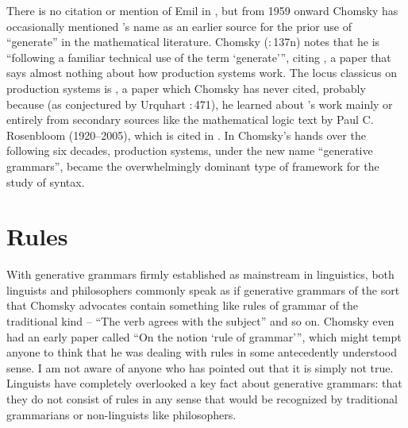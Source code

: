 \documentclass[output=paper]{langscibook}
\begin{document}
There is no citation or mention of Emil {\Post} in \citet{Chomsky55LSLT}, but from 1959 onward Chomsky has occasionally mentioned {\Post}'s name as an earlier source for the prior use of ``generate'' in the mathematical literature. Chomsky (\citeyear{Chomsky59CFPG}:\,137n) notes that he is ``following a familiar technical use of the term `generate'\thinspace'', citing \citet{Post44}, a paper that says almost nothing about how production systems work. The locus classicus on production systems is \citet{Post43}, a paper which Chomsky has never cited, probably because (as conjectured by Urquhart \citeyear{Urquhart09}:\,471), he learned about {\Post}'s work mainly or entirely from secondary sources like the \citeyear{Rosenbloom50} mathematical logic text by Paul C. Rosenbloom (1920--2005), which is cited in \citet{Chomsky75LSLT}. In Chomsky's hands over the following six decades, production systems, under the new name ``generative grammars'', became the overwhelmingly dominant type of framework for the study of syntax.

\section{Rules}
\label{sec:pullum:rules}

With generative grammars firmly established as mainstream in linguistics, both linguists and philosophers commonly speak as if generative grammars of the sort that Chomsky advocates contain something like rules of grammar of the traditional kind -- ``The verb agrees with the subject'' and so on. Chomsky even had an early paper called ``On the notion `rule of grammar'\thinspace'', which might tempt anyone to think that he was dealing with rules in some antecedently understood sense. I am not aware of anyone who has pointed out that it is simply not true. Linguists have completely overlooked a key fact about generative grammars: that they do not consist of rules in any sense that would be recognized by traditional grammarians or non-linguists like philosophers.
\end{document}
